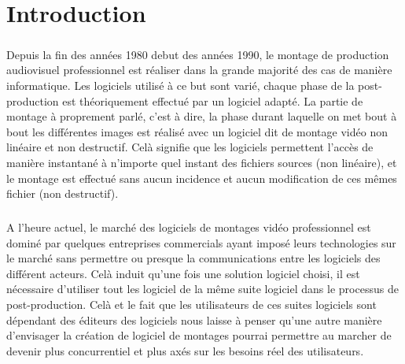 








\setcounter{page}{1}
\newpage \chapter{Introduction}

\paragraph{}

Depuis la fin des années 1980 debut des années 1990, le montage
de production audiovisuel professionnel est réaliser dans la grande
majorité des cas de manière informatique. Les logiciels utilisé à ce
but sont varié, chaque phase de la post-production est théoriquement
effectué par un logiciel adapté. La partie de montage à proprement
parlé, c'est à dire, la phase durant laquelle on met bout à bout
les différentes images est réalisé avec un logiciel dit de montage
vidéo non linéaire et non destructif. Celà signifie que les logiciels
permettent l'accès de manière instantané à n'importe quel instant des
fichiers sources (non linéaire), et le montage est effectué sans aucun
incidence et aucun modification de ces mêmes fichier (non destructif).

\paragraph{}

A l'heure actuel, le marché des logiciels de montages vidéo
professionnel est dominé par quelques entreprises commercials ayant
imposé leurs technologies sur le marché sans permettre ou presque la
communications entre les logiciels des différent acteurs.  Celà induit
qu'une fois une solution logiciel choisi, il est nécessaire d'utiliser
tout les logiciel de la même suite logiciel dans le processus de
post-production. Celà et le fait que les utilisateurs de ces suites
logiciels sont dépendant des éditeurs des logiciels nous laisse à
penser qu'une autre manière d'envisager la création de logiciel de
montages pourrai permettre au marcher de devenir plus concurrentiel et
plus axés sur les besoins réel des utilisateurs.

